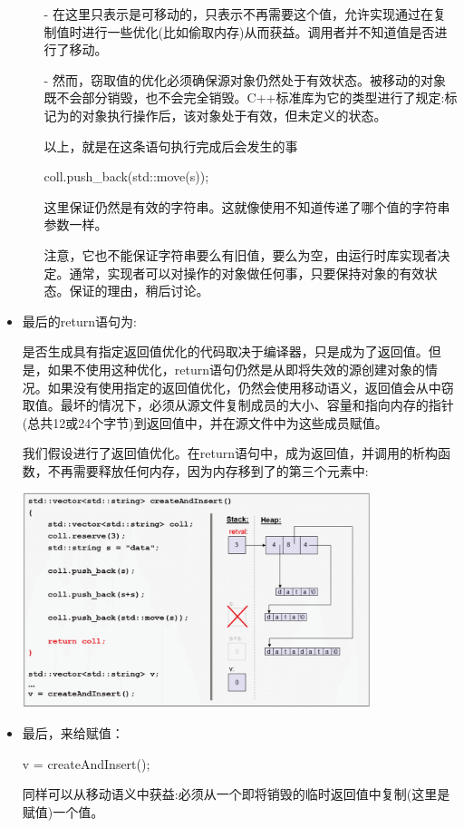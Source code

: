 \begin{itemize}
	\begin{itemize}
		\item[-] 在这里只表示是可移动的，只表示不再需要这个值，允许实现通过在复制值时进行一些优化(比如偷取内存)从而获益。调用者并不知道值是否进行了移动。
		\item[-] 然而，窃取值的优化必须确保源对象仍然处于有效状态。被移动的对象既不会部分销毁，也不会完全销毁。C++标准库为它的类型进行了规定:标记为的对象执行操作后，该对象处于有效，但未定义的状态。

		以上，就是在这条语句执行完成后会发生的事
\begin{cppcode}
coll.push_back(std::move(s));
\end{cppcode}
		这里保证仍然是有效的字符串。这就像使用不知道传递了哪个值的字符串参数一样。

		注意，它也不能保证字符串要么有旧值，要么为空，由运行时库实现者决定。通常，实现者可以对操作的对象做任何事，只要保持对象的有效状态。保证的理由，稍后讨论。
	\end{itemize}

	\item {}最后的return语句为:

	\begin{cppcode}
	return coll;
}
	\end{cppcode}
	是否生成具有指定返回值优化的代码取决于编译器，只是成为了返回值。但是，如果不使用这种优化，return语句仍然是从即将失效的源创建对象的情况。如果没有使用指定的返回值优化，仍然会使用移动语义，返回值会从中窃取值。最坏的情况下，必须从源文件复制成员的大小、容量和指向内存的指针(总共12或24个字节)到返回值中，并在源文件中为这些成员赋值。

	我们假设进行了返回值优化。在return语句中，成为返回值，并调用的析构函数，不再需要释放任何内存，因为内存移到了的第三个元素中:
\begin{center}
		\includegraphics[width=0.8\textwidth]{part1/ch1/images/15}
	\end{center}
	\item 最后，来给赋值：
\begin{cppcode}
v = createAndInsert();
\end{cppcode}
	同样可以从移动语义中获益:必须从一个即将销毁的临时返回值中复制(这里是赋值)一个值。


\end{itemize}
